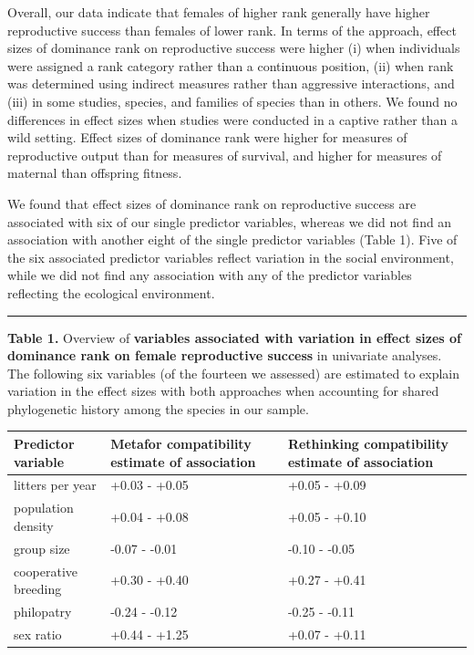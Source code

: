 \documentclass[
]{article}
\begin{document}
\hfill\break
Overall, our data indicate that females of higher rank generally have
higher reproductive success than females of lower rank. In terms of the
approach, effect sizes of dominance rank on reproductive success were
higher (i) when individuals were assigned a rank category rather than a
continuous position, (ii) when rank was determined using indirect
measures rather than aggressive interactions, and (iii) in some studies,
species, and families of species than in others. We found no differences
in effect sizes when studies were conducted in a captive rather than a
wild setting. Effect sizes of dominance rank were higher for measures of
reproductive output than for measures of survival, and higher for
measures of maternal than offspring fitness.

We found that effect sizes of dominance rank on reproductive success are
associated with six of our single predictor variables, whereas we did
not find an association with another eight of the single predictor
variables (Table 1). Five of the six associated predictor variables
reflect variation in the social environment, while we did not find any
association with any of the predictor variables reflecting the
ecological environment.

\begin{center}\rule{0.5\linewidth}{0.5pt}\end{center}

\textbf{Table 1.} Overview of \textbf{variables associated with
variation in effect sizes of dominance rank on female reproductive
success} in univariate analyses. The following six variables (of the
fourteen we assessed) are estimated to explain variation in the effect
sizes with both approaches when accounting for shared phylogenetic
history among the species in our sample.

\begin{tabu} to 
\hline
Predictor variable & Metafor compatibility estimate of association & Rethinking compatibility estimate of association\\
\hline
litters per year & +0.03 - +0.05 & +0.05 - +0.09\\
\hline
population density & +0.04 - +0.08 & +0.05 - +0.10\\
\hline
group size & -0.07 - -0.01 & -0.10 - -0.05\\
\hline
cooperative breeding & +0.30 - +0.40 & +0.27 - +0.41\\
\hline
philopatry & -0.24 - -0.12 & -0.25 - -0.11\\
\hline
sex ratio & +0.44 - +1.25 & +0.07 - +0.11\\
\hline
\end{tabu}
\end{document}
